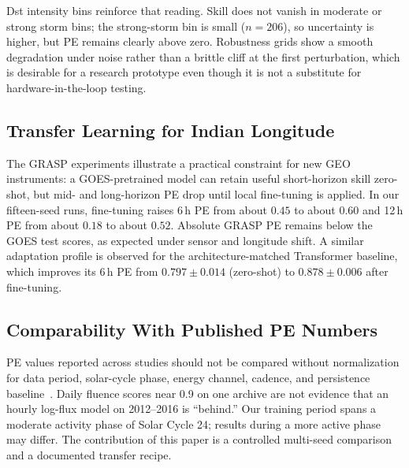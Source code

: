 \documentclass{ieeeaccess}
\begin{document}
Dst intensity bins reinforce that reading. Skill does not vanish in moderate or
strong storm bins; the strong-storm bin is small (\(n=206\)), so uncertainty is
higher, but PE remains clearly above zero. Robustness grids show a smooth
degradation under noise rather than a brittle cliff at the first perturbation,
which is desirable for a research prototype even though it is not a substitute
for hardware-in-the-loop testing.

\subsection{Transfer Learning for Indian Longitude}
The GRASP experiments illustrate a practical constraint for new GEO instruments:
a GOES-pretrained model can retain useful short-horizon skill zero-shot, but
mid- and long-horizon PE drop until local fine-tuning is applied.
In our fifteen-seed runs, fine-tuning raises 6\,h PE from about \(0.45\) to about
\(0.60\) and 12\,h PE from about \(0.18\) to about \(0.52\). Absolute GRASP PE
remains below the GOES test scores, as expected under sensor and longitude shift. A similar adaptation profile is observed for the architecture-matched Transformer baseline, which improves its 6\,h PE from \(0.797 \pm 0.014\) (zero-shot) to \(0.878 \pm 0.006\) after fine-tuning.

\subsection{Comparability With Published PE Numbers}
PE values reported across studies should not be compared without normalization
for data period, solar-cycle phase, energy channel, cadence, and persistence
baseline~\cite{b21,b22}. Daily fluence scores near 0.9 on one archive are not
evidence that an hourly log-flux model on 2012--2016 is ``behind.'' Our training
period spans a moderate activity phase of Solar Cycle 24; results during a more
active phase may differ. The contribution of this paper is a controlled
multi-seed comparison and a documented transfer recipe.
\end{document}
